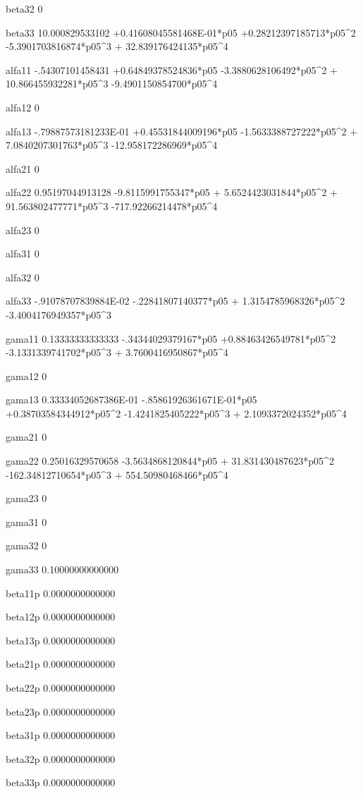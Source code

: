  beta32 
 0 
  
 beta33 
   10.000829533102 +0.41608045581468E-01*p05 +0.28212397185713*p05^2  -5.3901703816874*p05^3 + 32.839176424135*p05^4 
  
 alfa11 
  -.54307101458431 +0.64849378524836*p05  -3.3880628106492*p05^2 + 10.866455932281*p05^3  -9.4901150854700*p05^4 
  
 alfa12 
 0 
  
 alfa13 
  -.79887573181233E-01 +0.45531844009196*p05  -1.5633388727222*p05^2 + 7.0840207301763*p05^3  -12.958172286969*p05^4 
  
 alfa21 
 0 
  
 alfa22 
  0.95197044913128  -9.8115991755347*p05 + 5.6524423031844*p05^2 + 91.563802477771*p05^3  -717.92266214478*p05^4 
  
 alfa23 
 0 
  
 alfa31 
 0 
  
 alfa32 
 0 
  
 alfa33 
  -.91078707839884E-02  -.22841807140377*p05 + 1.3154785968326*p05^2  -3.4004176949357*p05^3 
  
 gama11 
  0.13333333333333  -.34344029379167*p05 +0.88463426549781*p05^2  -3.1331339741702*p05^3 + 3.7600416950867*p05^4 
  
 gama12 
 0 
  
 gama13 
  0.33334052687386E-01  -.85861926361671E-01*p05 +0.38703584344912*p05^2  -1.4241825405222*p05^3 + 2.1093372024352*p05^4 
  
 gama21 
 0 
  
 gama22 
  0.25016329570658  -3.5634868120844*p05 + 31.831430487623*p05^2  -162.34812710654*p05^3 + 554.50980468466*p05^4 
  
 gama23 
 0 
  
 gama31 
 0 
  
 gama32 
 0 
  
 gama33 
  0.10000000000000 
  
 beta11p
   0.0000000000000 
  
 beta12p
   0.0000000000000 
  
 beta13p
   0.0000000000000 
  
 beta21p
   0.0000000000000 
  
 beta22p
   0.0000000000000 
  
 beta23p
   0.0000000000000 
  
 beta31p
   0.0000000000000 
  
 beta32p
   0.0000000000000 
  
 beta33p
   0.0000000000000 
  
